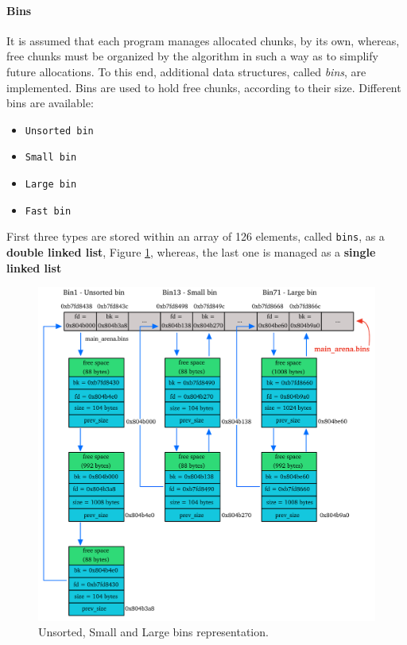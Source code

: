 \documentclass{article}
\numberwithin{equation}{subsection}
\begin{document}
\paragraph{Bins}
 It is assumed that each program manages allocated chunks, by its own, whereas, free chunks must be organized by the algorithm in such a way as to simplify future allocations.
To this end, additional data structures, called \emph{bins}, are implemented. Bins are used to hold free chunks, according to their size. Different bins are available:
\begin{itemize}
    \item \texttt{Unsorted bin}
    \item \texttt{Small bin}
    \item \texttt{Large bin}
    \item \texttt{Fast bin}
\end{itemize}
First three types are stored within an array of 126 elements, called \texttt{bins}, as a  \textbf{double linked list}, Figure \ref{fig:bins}, whereas, the last one is managed as a \textbf{single linked list}
\begin{figure}[htb]
    \centering
    \includegraphics[width=\textwidth]{main_arena_bins.pdf}
    \caption{Unsorted, Small and Large bins representation.}
    \label{fig:bins}
\end{figure}
\end{document}
